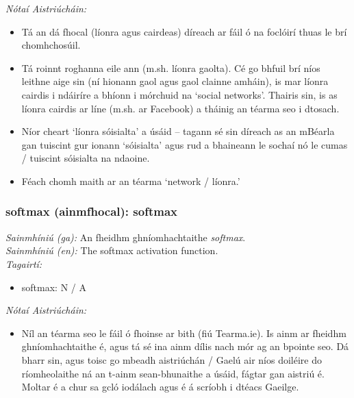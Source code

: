  \noindent \textit{Nótaí Aistriúcháin:}
\begin{itemize}
	\item Tá an dá fhocal (líonra agus cairdeas) díreach ar fáil ó na foclóirí thuas le brí chomhchosúil.
	\item Tá roinnt roghanna eile ann (m.sh. líonra gaolta). Cé go bhfuil brí níos leithne aige sin (ní hionann gaol agus gaol clainne amháin), is mar líonra cairdis i ndáiríre a bhíonn i mórchuid na `social networks'. Thairis sin, is as líonra cairdis ar líne (m.sh. ar Facebook) a tháinig an téarma seo i dtosach.
	\item Níor cheart `líonra sóisialta' a úsáid -- tagann sé sin díreach as an mBéarla gan tuiscint gur ionann `sóisialta' agus rud a bhaineann le sochaí nó le cumas / tuiscint sóisialta na ndaoine.
	\item Féach chomh maith ar an téarma `network / líonra.'
\end{itemize}


\subsubsection*{softmax (ainmfhocal): softmax}
 \noindent \textit{Sainmhíniú (ga):} An fheidhm ghníomhachtaithe  \noindent \textit{softmax}.
\\
 \noindent \textit{Sainmhíniú (en):} The softmax activation function.
\\
 \noindent \textit{Tagairtí:}
\begin{itemize}
	\item softmax: N / A
\end{itemize}

 \noindent \textit{Nótaí Aistriúcháin:}
\begin{itemize}
	\item Níl an téarma seo le fáil ó fhoinse ar bith (fiú Tearma.ie). Is ainm ar fheidhm ghníomhachtaithe é, agus tá sé ina ainm dílis nach mór ag an bpointe seo. Dá bharr sin, agus toisc go mbeadh aistriúchán / Gaelú air níos doiléire do ríomheolaithe ná an t-ainm sean-bhunaithe a úsáid, fágtar gan aistriú é. Moltar é a chur sa gcló iodálach agus é á scríobh i dtéacs Gaeilge.
\end{itemize}



